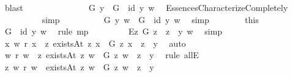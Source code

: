 \begin{isabellebody}
\ blast\ \ \ \ \ \ \isanewline
\ \ \ \ \ \ \isamarkupfalse%
\ {\isachardoublequoteopen}{\isacharparenleft}{\isasymE}\ G\ y\ \isactrlbold {\isasymrightarrow}\ {\isacharparenleft}G\ {\isasymRrightarrow}\ id\ y{\isacharparenright}{\isacharparenright}\ w{\isachardoublequoteclose}\ \isamarkupfalse%
\ EssencesCharacterizeCompletely\isanewline
\ \ \ \ \ \ \ \ \isamarkupfalse%
\ simp\ %
\isanewline
\ \ \ \ \ \ \isamarkupfalse%
\ {\isachardoublequoteopen}{\isasymE}\ G\ y\ w\ {\isasymlongrightarrow}\ {\isacharparenleft}{\isacharparenleft}G\ {\isasymRrightarrow}\ id\ y{\isacharparenright}\ w{\isacharparenright}{\isachardoublequoteclose}\ \isamarkupfalse%
\ simp\isanewline
\ \ \ \ \ \ \isamarkupfalse%
\ this\ {}\ \isamarkupfalse%
\ {\isachardoublequoteopen}{\isacharparenleft}G\ {\isasymRrightarrow}\ id\ y{\isacharparenright}\ w{\isachardoublequoteclose}\ \isamarkupfalse%
\ {\isacharparenleft}rule\ mp{\isacharparenright}\ \isanewline
\ \ \ \ \ \ \isamarkupfalse%
\ {\isachardoublequoteopen}{\isacharparenleft}\isactrlbold {\isasymbox}{\isacharparenleft}\isactrlbold {\isasymforall}\isactrlsup Ez{\isachardot}\ G\ z\ \isactrlbold {\isasymrightarrow}\ z\ \isactrlbold {\isasymapprox}\ y{\isacharparenright}{\isacharparenright}\ w{\isachardoublequoteclose}\ \isamarkupfalse%
\ simp\isanewline
\ \ \ \ \ \ \isamarkupfalse%
\ {\isachardoublequoteopen}{\isasymforall}x{\isachardot}\ w\ r\ x\ {\isasymlongrightarrow}\ {\isacharparenleft}{\isacharparenleft}{\isasymforall}z{\isachardot}\ {\isacharparenleft}existsAt\ z\ x\ {\isasymand}\ G\ z\ x{\isacharparenright}\ {\isasymlongrightarrow}\ z\ {\isacharequal}\ y{\isacharparenright}{\isacharparenright}{\isachardoublequoteclose}\ \isamarkupfalse%
\ auto\isanewline
\ \ \ \ \ \ \isamarkupfalse%
\ {\isachardoublequoteopen}w\ r\ w\ {\isasymlongrightarrow}\ {\isacharparenleft}{\isacharparenleft}{\isasymforall}z{\isachardot}\ {\isacharparenleft}existsAt\ z\ w\ {\isasymand}\ G\ z\ w{\isacharparenright}\ {\isasymlongrightarrow}\ z\ {\isacharequal}\ y{\isacharparenright}{\isacharparenright}{\isachardoublequoteclose}\ \isamarkupfalse%
\ {\isacharparenleft}rule\ allE{\isacharparenright}\isanewline
\ \ \ \ \ \ \isamarkupfalse%
\ {\isachardoublequoteopen}{\isasymforall}z{\isachardot}\ {\isacharparenleft}w\ r\ w\ {\isasymand}\ existsAt\ z\ w\ {\isasymand}\ G\ z\ w{\isacharparenright}\ {\isasymlongrightarrow}\ z\ {\isacharequal}\ y{\isachardoublequoteclose}\ \isamarkupfalse%

\end{isabellebody}
